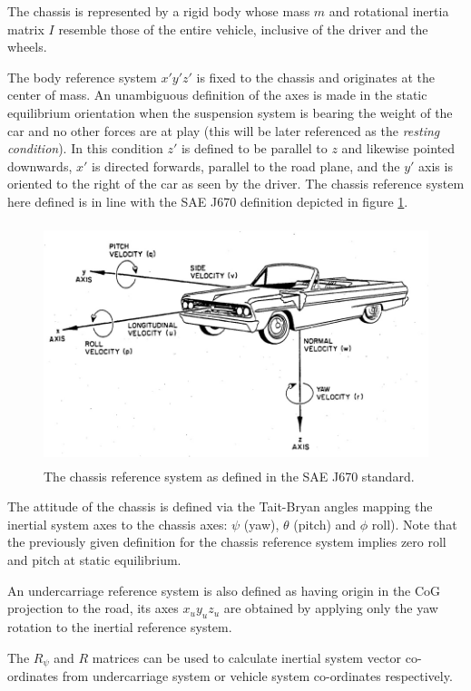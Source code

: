 The chassis is represented by a rigid body whose mass $m$ and rotational inertia matrix $I$ resemble those of the entire vehicle, inclusive of the driver and the wheels.

The body reference system $x'y'z'$ is fixed to the chassis and originates at the center of mass. An unambiguous definition of the axes is made in the static equilibrium orientation when the suspension system is bearing the weight of the car and no other forces are at play (this will be later referenced as the \textit{resting condition}). In this condition $z'$ is defined to be parallel to $z$ and likewise pointed downwards, $x'$ is directed forwards, parallel to the road plane, and the $y'$ axis is oriented to the right of the car as seen by the driver. The chassis reference system here defined is in line with the SAE J670\cite{j670} definition depicted in figure \ref{saeaxes}.
\begin{figure}[ht]
  \centering
  \includegraphics[height = 7cm]{images/saeaxes}
  \caption{The chassis reference system as defined in the SAE J670 standard.}
  \label{saeaxes}
\end{figure}

The attitude of the chassis is defined via the Tait-Bryan angles mapping the inertial system axes to the chassis axes: $\psi$ (yaw), $\theta$ (pitch) and $\phi$ roll).  Note that the previously given definition for the chassis reference system implies zero roll and pitch at static equilibrium.

An undercarriage reference system is also defined as having origin in the CoG projection to the road, its axes $x_uy_uz_u$ are obtained by applying only the yaw rotation to the inertial reference system.

The $R_\psi$ and $R$ matrices can be used to calculate inertial system vector co-ordinates from undercarriage system or vehicle system co-ordinates respectively.

